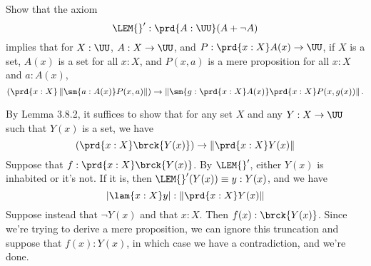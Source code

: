 Show that the axiom
\[
    \LEM{}': \prd{A:\UU} (A + \lnot A)
\]
implies that for $X : \UU$, $A : X \to \UU$, and $P : \prd{x:X} A(x) \to \UU$,
if $X$ is a set, $A(x)$ is a set for all $x:X$, and $P(x, a)$ is a mere
proposition for all $x:X$ and $a:A(x)$, 
\[
  \left(\prd{x:X}\left\lVert\sm{a:A(x)}P(x, a)\right\rVert\right)
  \to
  \left\lVert \sm{g:\prd{x:X}A(x)}\prd{x:X}P(x, g(x))\right\rVert.
\]


 \soln
By Lemma 3.8.2, it suffices to show that for any set $X$ and any $Y : X \to
\UU$ such that $Y(x)$ is a set, we have
\[
  \left(\prd{x:X}\brck{Y(x)}\right) \to \left\lVert\prd{x:X}Y(x)\right\rVert
\]
Suppose that $f : \prd{x:X}\brck{Y(x)}$.  By $\LEM{}'$, either $Y(x)$ is
inhabited or it's not.  If it is, then $\LEM{}'(Y(x)) \equiv y : Y(x)$, and we
have
\[
  \left\lvert\lam{x:X}y\right\rvert : \left\lVert \prd{x:X} Y(x) \right\rVert
\]
Suppose instead that $\lnot Y(x)$ and that $x:X$.  Then $f(x) : \brck{Y(x)}$.
Since we're trying to derive a mere proposition, we can ignore this truncation
and suppose that $f(x) : Y(x)$, in which case we have a contradiction, and
we're done.


